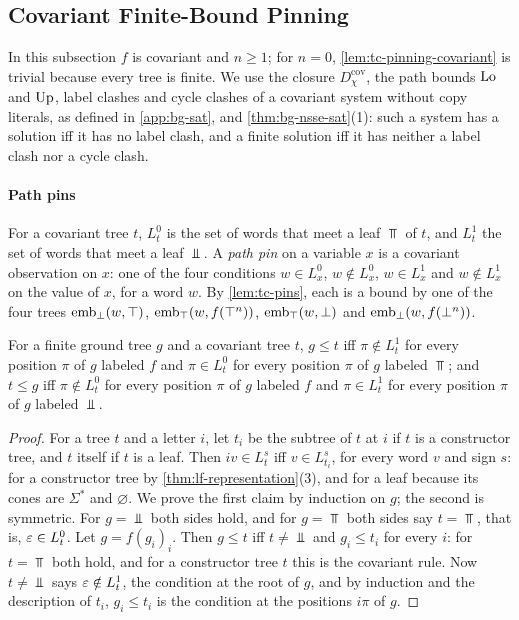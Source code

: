 \subsection{Covariant Finite-Bound Pinning}\label{app:tc-covariant}

In this subsection $f$ is covariant and $n\ge1$; for $n=0$,
\cref{lem:tc-pinning-covariant} is trivial because every tree is finite. We use
the closure $D^{\mathrm{cov}}_\chi$, the path bounds $\mathrm{Lo}$ and $\mathrm{Up}$, label clashes and cycle
clashes of a covariant system without copy literals, as defined in
\cref{app:bg-sat}, and \cref{thm:bg-nsse-sat}(1): such a system has a
solution iff it has no label clash, and a finite solution iff it has neither a
label clash nor a cycle clash.

\paragraph{Path pins}
For a covariant tree $t$, $L^0_t$ is the set of words that meet a leaf $\Top$
of $t$, and $L^1_t$ the set of words that meet a leaf $\Bot$. A \emph{path
pin} on a variable $x$ is a covariant observation on $x$: one of the four
conditions $w\in L^0_x$, $w\notin L^0_x$, $w\in L^1_x$ and $w\notin L^1_x$ on
the value of $x$, for a word $w$. By \cref{lem:tc-pins}, each is a bound by one
of the four trees $\operatorname{emb}_\bot(w,\top)$, $\operatorname{emb}_\top(w,f(\top^n))$,
$\operatorname{emb}_\top(w,\bot)$ and $\operatorname{emb}_\bot(w,f(\bot^n))$.

\begin{lemma}\label{lem:tc-ground-pins}
For a finite ground tree $g$ and a covariant tree $t$, $g\le t$ iff
$\pi\notin L^1_t$ for every position $\pi$ of $g$ labeled $f$ and $\pi\in L^0_t$
for every position $\pi$ of $g$ labeled $\Top$; and $t\le g$ iff
$\pi\notin L^0_t$ for every position $\pi$ of $g$ labeled $f$ and $\pi\in L^1_t$
for every position $\pi$ of $g$ labeled $\Bot$.
\end{lemma}

\begin{proof}
For a tree $t$ and a letter $i$, let $t_i$ be the subtree of $t$ at $i$ if $t$
is a constructor tree, and $t$ itself if $t$ is a leaf. Then $iv\in L^s_t$ iff
$v\in L^s_{t_i}$, for every word $v$ and sign $s$: for a constructor tree by
\cref{thm:lf-representation}(3), and for a leaf because its cones are
$\Sigma^*$ and $\varnothing$. We prove the first claim by induction on
$g$; the second is symmetric. For $g=\Bot$ both sides hold, and for $g=\Top$
both sides say $t=\Top$, that is, $\varepsilon\in L^0_t$. Let $g=f(g_i)_i$. Then
$g\le t$ iff $t\ne\Bot$ and $g_i\le t_i$ for every $i$: for $t=\Top$ both hold,
and for a constructor tree $t$ this is the covariant rule. Now $t\ne\Bot$ says
$\varepsilon\notin L^1_t$, the condition at the root of $g$, and by induction and the
description of $t_i$, $g_i\le t_i$ is the condition at the positions $i\pi$ of
$g$.
\end{proof}

